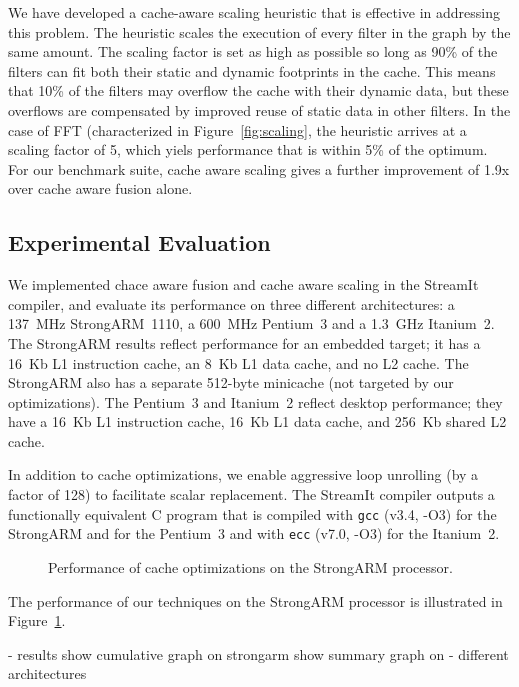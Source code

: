 We have developed a cache-aware scaling heuristic that is effective in
addressing this problem.  The heuristic scales the execution of every
filter in the graph by the same amount.  The scaling factor is set as
high as possible so long as 90\% of the filters can fit both their
static and dynamic footprints in the cache.  This means that 10\% of
the filters may overflow the cache with their dynamic data, but these
overflows are compensated by improved reuse of static data in other
filters.  In the case of FFT (characterized in
Figure~\ref{fig:scaling}, the heuristic arrives at a scaling factor of
5, which yiels performance that is within 5\% of the optimum.  For our
benchmark suite, cache aware scaling gives a further improvement of
1.9x over cache aware fusion alone.

\subsection*{Experimental Evaluation}

We implemented chace aware fusion and cache aware scaling in the
StreamIt compiler, and evaluate its performance on three different
architectures: a 137~MHz StrongARM~1110, a 600~MHz Pentium~3 and a
1.3~GHz Itanium~2. The StrongARM results reflect performance for an
embedded target; it has a 16~Kb L1 instruction cache, an 8~Kb L1 data
cache, and no L2 cache.  The StrongARM also has a separate 512-byte
minicache (not targeted by our optimizations).  The Pentium~3 and
Itanium~2 reflect desktop performance; they have a 16~Kb L1
instruction cache, 16~Kb L1 data cache, and 256~Kb shared L2 cache.

In addition to cache optimizations, we enable aggressive loop
unrolling (by a factor of 128) to facilitate scalar replacement.  The
StreamIt compiler outputs a functionally equivalent C program that is
compiled with \texttt{gcc} (v3.4, -O3) for the StrongARM and for the
Pentium~3 and with \texttt{ecc} (v7.0, -O3) for the Itanium~2.

\begin{figure}[t]
\centering
{}
\caption{Performance of cache optimizations on the StrongARM processor.\protect\label{fig:arm}}
\end{figure}

The performance of our techniques on the StrongARM processor is
illustrated in Figure~\ref{fig:arm}.

- results show cumulative graph on strongarm show summary graph on
 - different architectures


